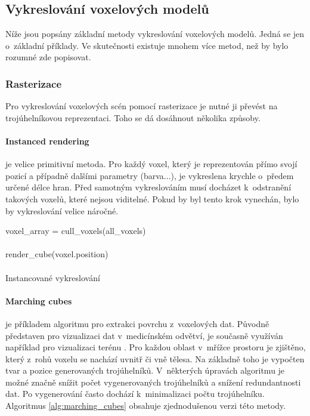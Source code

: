 \subsection{Vykreslování voxelových modelů}\label{sec:voxel_render}
Níže jsou popsány základní metody vykreslování voxelových modelů. Jedná se jen o~základní příklady. Ve skutečnosti existuje mnohem více metod, než by bylo rozumné zde popisovat.

\subsubsection{Rasterizace}
Pro vykreslování voxelových scén pomocí rasterizace je nutné ji převést na trojúhelníkovou reprezentaci. Toho se dá dosáhnout několika způsoby.

\paragraph{Instanced rendering} je velice primitivní metoda. Pro každý voxel, který je reprezentován přímo svojí pozicí a případně dalšími parametry (barva...), je vykreslena krychle o~předem určené délce hran. Před samotným vykreslováním musí docházet k~odstranění takových voxelů, které nejsou viditelné. Pokud by byl tento krok vynechán, bylo by vykreslování velice náročné. \cite{nousiainen_2019}

\begin{center}
	\begin{czechalgorithm}[H] \label{alg:instanced_cube}
		voxel\_array = cull\_voxels(all\_voxels)\\
		 {\\
			render\_cube(voxel.position)\\
		}\\
		\caption{Instancované vykreslování}
	\end{czechalgorithm}
\end{center}

\paragraph{Marching cubes \cite{marching_cubes}} je příkladem algoritmu pro extrakci povrchu z~voxelových dat. Původně představen pro vizualizaci dat v~medicínském odvětví, je současně využíván například pro vizualizaci terénu \cite{nguyen_2008}. Pro každou oblast v~mřížce prostoru je zjištěno, který z~rohů voxelu se nachází uvnitř či vně tělesa. Na základně toho je vypočten tvar a pozice generovaných trojúhelníků. V~některých úpravách algoritmu je možné značně snížit počet vygenerovaných trojúhelníků a snížení redundantnosti dat. Po vygenerování často dochází k~minimalizaci počtu trojúhelníku. Algoritmus \ref{alg:marching_cubes} obsahuje zjednodušenou verzi této metody.

